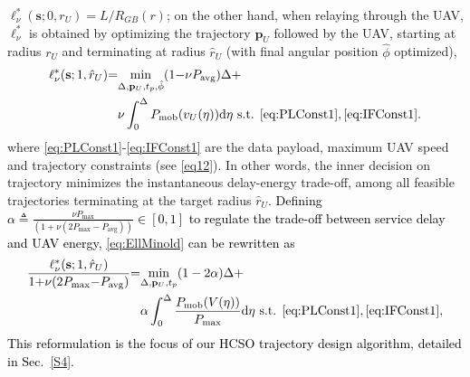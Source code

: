 \documentclass[10pt, twocolumn]{IEEEtran}
\theoremstyle{plain}
\theoremstyle{definition}
\theoremstyle{remark}
\newcommand\hlt[1]{\textcolor{black}{#1}}
\begin{document}
 $\ell_{\nu}^{*}(\mathbf{s};0,r_U)=L/R_{GB}(r)$; on the other hand, when relaying through the UAV, $\ell_{\nu}^{*}$
is obtained by optimizing the trajectory $\mathbf{p}_{U}$ followed by the UAV, starting at radius $r_U$ and terminating at radius $\hat{r}_{U}$ (with final angular position $\hat\phi$ optimized),
\begin{align}
    \ell_{\nu}^{*}(\mathbf{s};1,\hat{r}_{U}){=}&\underset{\Delta,\mathbf{p}_{U},t_{p},\hat\phi}{\mathrm{min}}(1{-}\nu P_{\mathrm{avg}})\Delta{+}\\&\nu\int_{0}^{\Delta}P_{\mathrm{mob}}(v_U(\eta))\mathrm{d}\eta \text{ s.t.}\;\, \text{\ref{eq:PLConst1}},\text{\ref{eq:IFConst1}}\label{eq:EllMinold}.
\end{align}
where \ref{eq:PLConst1}-\ref{eq:IFConst1} are the data payload, maximum UAV speed and trajectory constraints (see \eqref{eq12}).
 In other words, the inner decision on trajectory minimizes the instantaneous delay-energy trade-off, among all feasible trajectories terminating at the target radius $\hat{r}_{U}$. 
\hlt{Defining $\alpha{\triangleq}\frac{\nu P_{\max}}{(1{+}\nu(2P_{\max}{-}P_{\mathrm{avg}}))} \in [0,1]$ to regulate the trade-off between service delay and UAV energy, \eqref{eq:EllMinold} can be rewritten as
\begin{align}
    \frac{\ell_{\nu}^{*}(\mathbf{s};1,\hat{r}_{U})}{1{+}\nu(2P_{\max}{-} P_{\mathrm{avg}})}{=}&
    \underset{\Delta,\mathbf{p}_{U},t_{p}}{\mathrm{min}}(1-2\alpha)\Delta
    {+}\\&\alpha\int_{0}^{\Delta}
\frac{P_{\mathrm{mob}}(V(\eta))
}{P_{\max}}\mathrm{d}\eta \text{ s.t.}\;\, \text{\ref{eq:PLConst1}},\text{\ref{eq:IFConst1}}\label{eq:EllMin},
\end{align}
This reformulation is the focus of our HCSO trajectory design algorithm, detailed in Sec.~\ref{S4}.}
\end{document}
